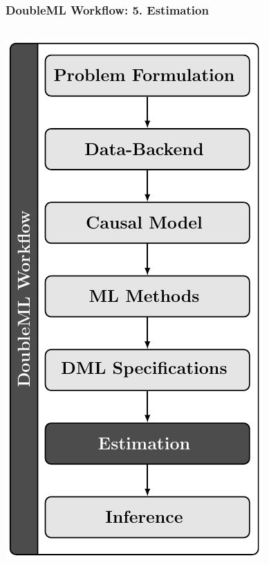 \begin{frame}[fragile]
\frametitle{DoubleML Workflow: 5. Estimation}
\begin{columns}
\begin{column}{0.3\textwidth}
\includegraphics[width = \textwidth]{workflow/doubleml_workflow_est.pdf}

\end{column}
\end{columns}
\end{frame}
